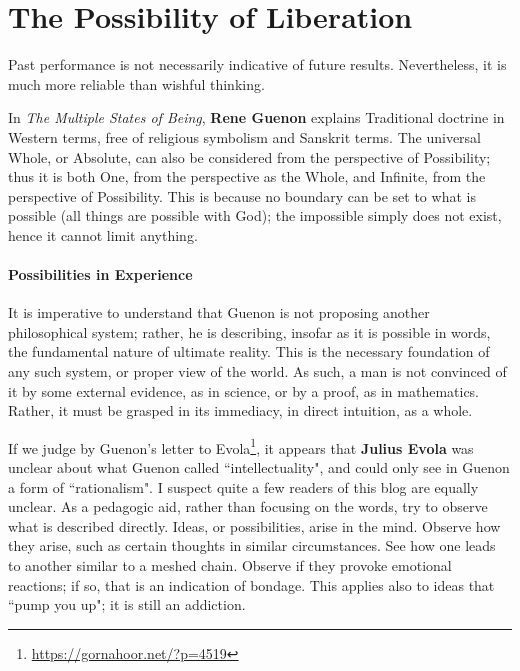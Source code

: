 \section{The Possibility of Liberation}

\begin{quotex}
Past performance is not necessarily indicative of future results. Nevertheless, it is much more reliable than wishful thinking. 

\end{quotex}

In \textit{The Multiple States of Being}, \textbf{Rene Guenon} explains Traditional doctrine in Western terms, free of religious symbolism and Sanskrit terms. The universal Whole, or Absolute, can also be considered from the perspective of Possibility; thus it is both One, from the perspective as the Whole, and Infinite, from the perspective of Possibility. This is because no boundary can be set to what is possible (all things are possible with God); the impossible simply does not exist, hence it cannot limit anything.


\paragraph{Possibilities in Experience}
It is imperative to understand that Guenon is not proposing another philosophical system; rather, he is describing, insofar as it is possible in words, the fundamental nature of ultimate reality. This is the necessary foundation of any such system, or proper view of the world. As such, a man is not convinced of it by some external evidence, as in science, or by a proof, as in mathematics. Rather, it must be grasped in its immediacy, in direct intuition, as a whole.

If we judge by Guenon's letter to Evola\footnote{\url{https://gornahoor.net/?p=4519}}, it appears that \textbf{Julius Evola} was unclear about what Guenon called ``intellectuality", and could only see in Guenon a form of ``rationalism". I suspect quite a few readers of this blog are equally unclear. As a pedagogic aid, rather than focusing on the words, try to observe what is described directly. Ideas, or possibilities, arise in the mind. Observe how they arise, such as certain thoughts in similar circumstances. See how one leads to another similar to a meshed chain. Observe if they provoke emotional reactions; if so, that is an indication of bondage. This applies also to ideas that ``pump you up"; it is still an addiction.

